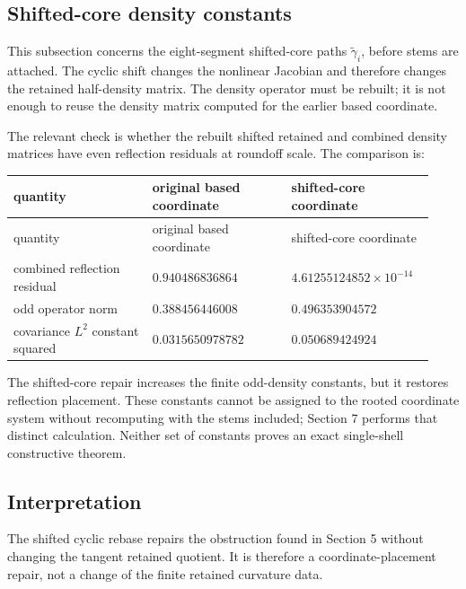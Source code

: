 \documentclass[10pt]{article}
\begin{document}
\subsection{Shifted-core density constants}

This subsection concerns the eight-segment shifted-core paths \(\widetilde\gamma_i\), before stems are attached.  The cyclic shift changes the nonlinear Jacobian and therefore changes the retained half-density matrix.  The density operator must be rebuilt; it is not enough to reuse the density matrix computed for the earlier based coordinate.

The relevant check is whether the rebuilt shifted retained and combined density matrices have even reflection residuals at roundoff scale.  The comparison is:

\begin{center}
\small
\begin{longtable}{|p{0.31\linewidth}|p{0.31\linewidth}|p{0.31\linewidth}|}
\hline
quantity & original based coordinate & shifted-core coordinate \\
\hline
\endfirsthead
\hline
quantity & original based coordinate & shifted-core coordinate \\
\hline
\endhead
combined reflection residual & \(0.940486836864\) & \(4.61255124852\times10^{-14}\) \\
\hline
odd operator norm & \(0.388456446008\) & \(0.496353904572\) \\
\hline
covariance \(L^2\) constant squared & \(0.0315650978782\) & \(0.050689424924\) \\
\hline
\end{longtable}
\end{center}

The shifted-core repair increases the finite odd-density constants, but it restores reflection placement.  These constants cannot be assigned to the rooted coordinate system without recomputing with the stems included; Section 7 performs that distinct calculation.  Neither set of constants proves an exact single-shell constructive theorem.

\subsection{Interpretation}

The shifted cyclic rebase repairs the obstruction found in Section 5 without changing the tangent retained quotient.  It is therefore a coordinate-placement repair, not a change of the finite retained curvature data.
\end{document}
